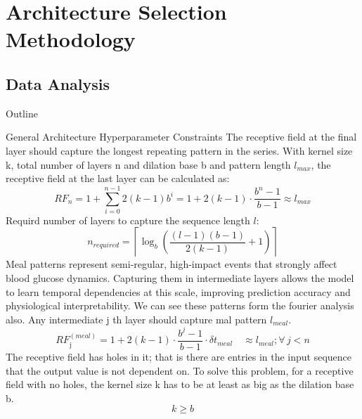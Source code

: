 \documentclass[8pt,xcolor=dvipsnames,compress]{beamer}
\begin{document}

\section{Architecture Selection Methodology}
\subsection{Data Analysis}
\begin{frame}{Outline}
\end{frame}
%
\begin{frame}{General Architecture Hyperparameter Constraints}
\footnotesize
The receptive field at the final layer should capture the longest repeating pattern in the series. With kernel size k, total number of layers n and dilation base b and pattern length $l_{max}$, the receptive field at the last layer can be calculated as:
\begin{equation}
RF_n = 1 + \sum_{i=0}^{n-1} 2(k - 1)b^i = 1 + 2(k - 1) \cdot \frac{b^n - 1}{b - 1} \approx l_{max}
\end{equation}
\noindent
Requird number of layers to capture the sequence length $l$:
\begin{equation}
n_{required} = \left\lceil \log_b \left( \frac{(l - 1)(b - 1)}{2(k - 1)} + 1 \right) \right\rceil
\end{equation}
\noindent
Meal patterns represent semi-regular, high-impact events that strongly affect blood glucose dynamics.
Capturing them in intermediate layers allows the model to learn temporal dependencies at this scale, improving prediction accuracy and physiological interpretability. We can see these patterns form the fourier analysis also. Any intermediate j th layer should capture mal pattern $l_{meal}$. 
\begin{equation}
RF_{\text{j}}^{(meal)} = 1 + 2(k - 1) \cdot \frac{b^j - 1}{b - 1} \cdot \delta t_{meal} \quad \approx l_{meal};  \forall\, j < n
\end{equation}
\noindent
The receptive field has holes in it; that is there are entries in the input sequence that the output value is not dependent on. To solve this problem, for a receptive field with no holes, the kernel size k has to be at least as big as the dilation base b.
\begin{equation}
k \ge b
\end{equation}

\end{frame}
\end{document}
